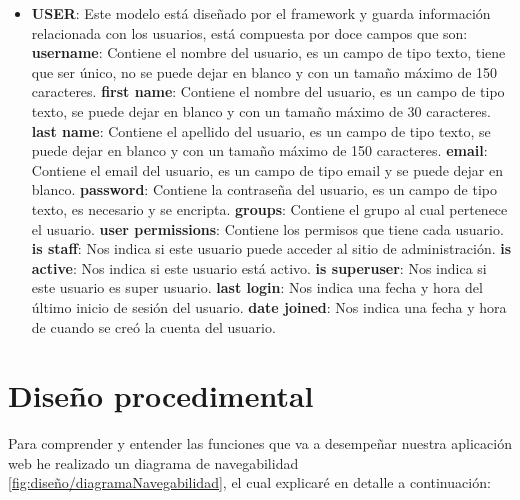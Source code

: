 \begin{itemize}
	\item \textbf{USER}: Este modelo está diseñado por el framework y guarda información relacionada con los usuarios, está compuesta por doce campos que son:
	\subitem \textbf{username}: Contiene el nombre del usuario, es un campo de tipo texto, tiene que ser único, no se puede dejar en blanco y con un tamaño máximo de 150 caracteres.
	\subitem \textbf{first name}: Contiene el nombre del usuario, es un campo de tipo texto, se puede dejar en blanco y con un tamaño máximo de 30 caracteres.
	\subitem \textbf{last name}: Contiene el apellido del usuario, es un campo de tipo texto, se puede dejar en blanco y con un tamaño máximo de 150 caracteres.
	\subitem \textbf{email}: Contiene el email del usuario, es un campo de tipo email y se puede dejar en blanco.
	\subitem \textbf{password}: Contiene la contraseña del usuario, es un campo de tipo texto, es necesario y se encripta.
	\subitem \textbf{groups}: Contiene el grupo al cual pertenece el usuario.
	\subitem \textbf{user permissions}: Contiene los permisos que tiene cada usuario.
	\subitem \textbf{is staff}: Nos indica si este usuario puede acceder al sitio de administración.
	\subitem \textbf{is active}: Nos indica si este usuario está activo.
	\subitem \textbf{is superuser}: Nos indica si este usuario es super usuario.
	\subitem \textbf{last login}: Nos indica una fecha y hora del último inicio de sesión del usuario.
	\subitem \textbf{date joined}: Nos indica una fecha y hora de cuando se creó la cuenta del usuario.
	
\end{itemize}

\section{Diseño procedimental}

Para comprender y entender las funciones que va a desempeñar nuestra aplicación web he realizado un diagrama de navegabilidad \ref{fig:diseño/diagramaNavegabilidad}, el cual explicaré en detalle a continuación:

